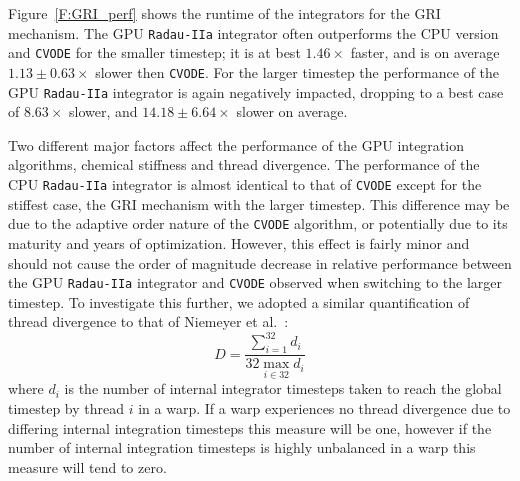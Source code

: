 \documentclass[preprint]{elsarticle}
\begin{document}
Figure~\ref{F:GRI_perf} shows the runtime of the integrators for the GRI mechanism.
The GPU \texttt{Radau-IIa} integrator often outperforms the CPU version and \texttt{CVODE} for the smaller timestep; it is at best $1.46\times$ faster, and is on average $1.13\pm0.63\times$ slower then \texttt{CVODE}.
For the larger timestep the performance of the GPU \texttt{Radau-IIa} integrator is again negatively impacted, dropping to a best case of $8.63\times$ slower, and $14.18\pm6.64\times$ slower on average.

Two different major factors affect the performance of the GPU integration algorithms, chemical stiffness and thread divergence.
The performance of the CPU \texttt{Radau-IIa} integrator is almost identical to that of \texttt{CVODE} except for the stiffest case, the GRI mechanism with the larger timestep.
This difference may be due to the adaptive order nature of the \texttt{CVODE} algorithm, or potentially due to its maturity and years of optimization.
However, this effect is fairly minor and should not cause the order of magnitude decrease in relative performance between the GPU \texttt{Radau-IIa} integrator and \texttt{CVODE} observed when switching to the larger timestep.
To investigate this further, we adopted a similar quantification of thread divergence to that of Niemeyer et al.~\cite{Niemeyer:2014aa}:
\begin{equation}
	D = \frac{\sum_{i=1}^{32}{d_i}}{32 \max_{i \in 32} d_i}
	\label{eqn:divergence}
\end{equation}
where $d_i$ is the number of internal integrator timesteps taken to reach the global timestep by thread $i$ in a warp.
If a warp experiences no thread divergence due to differing internal integration timesteps this measure will be one, however if the number of internal integration timesteps is highly unbalanced in a warp this measure will tend to zero.
\end{document}
